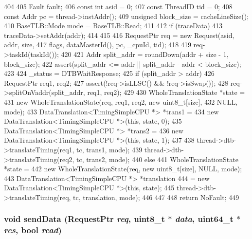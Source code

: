 \begin{DoxyCode}
404 {
405     Fault fault;
406     const int asid = 0;
407     const ThreadID tid = 0;
408     const Addr pc = thread->instAddr();
409     unsigned block_size = cacheLineSize();
410     BaseTLB::Mode mode = BaseTLB::Read;
411 
412     if (traceData) {
413         traceData->setAddr(addr);
414     }
415 
416     RequestPtr req  = new Request(asid, addr, size,
417                                   flags, dataMasterId(), pc, _cpuId, tid);
418 
419     req->taskId(taskId());
420 
421     Addr split_addr = roundDown(addr + size - 1, block_size);
422     assert(split_addr <= addr || split_addr - addr < block_size);
423 
424     _status = DTBWaitResponse;
425     if (split_addr > addr) {
426         RequestPtr req1, req2;
427         assert(!req->isLLSC() && !req->isSwap());
428         req->splitOnVaddr(split_addr, req1, req2);
429 
430         WholeTranslationState *state =
431             new WholeTranslationState(req, req1, req2, new uint8_t[size],
432                                       NULL, mode);
433         DataTranslation<TimingSimpleCPU *> *trans1 =
434             new DataTranslation<TimingSimpleCPU *>(this, state, 0);
435         DataTranslation<TimingSimpleCPU *> *trans2 =
436             new DataTranslation<TimingSimpleCPU *>(this, state, 1);
437 
438         thread->dtb->translateTiming(req1, tc, trans1, mode);
439         thread->dtb->translateTiming(req2, tc, trans2, mode);
440     } else {
441         WholeTranslationState *state =
442             new WholeTranslationState(req, new uint8_t[size], NULL, mode);
443         DataTranslation<TimingSimpleCPU *> *translation
444             = new DataTranslation<TimingSimpleCPU *>(this, state);
445         thread->dtb->translateTiming(req, tc, translation, mode);
446     }
447 
448     return NoFault;
449 }
\end{DoxyCode}
\hypertarget{classTimingSimpleCPU_ad6486c2f7c95532e093a31f013b36fe5}{
\subsubsection[{sendData}]{\setlength{\rightskip}{0pt plus 5cm}void sendData ({\bf RequestPtr} {\em req}, \/  uint8\_\-t $\ast$ {\em data}, \/  uint64\_\-t $\ast$ {\em res}, \/  bool {\em read})}}
\label{classTimingSimpleCPU_ad6486c2f7c95532e093a31f013b36fe5}



